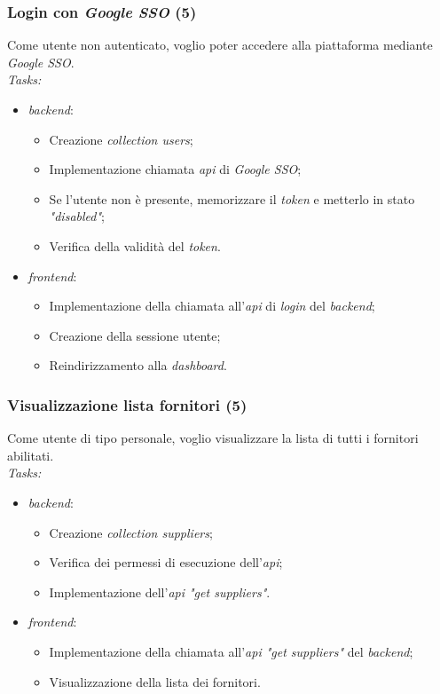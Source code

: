 \subsubsection{Login con \emph{Google SSO} (5)}
Come utente non autenticato, voglio poter accedere alla piattaforma mediante \emph{Google SSO}. \\
\emph{Tasks:}
\begin{itemize}
  \item \emph{\Gls{backend}}:
    \begin{itemize}
      \item Creazione \emph{collection users};
      \item Implementazione chiamata \emph{\acrshort{api}} di \emph{Google SSO};
      \item Se l'utente non è presente, memorizzare il \emph{token} e metterlo in stato \emph{"disabled"};
      \item Verifica della validità del \emph{token}.
    \end{itemize}
  \item \emph{\Gls{frontend}}:
    \begin{itemize}
      \item Implementazione della chiamata all'\emph{\acrshort{api}} di \emph{login} del \emph{\gls{backend}};
      \item Creazione della sessione utente;
      \item Reindirizzamento alla \emph{dashboard}.
    \end{itemize}
\end{itemize}

\subsubsection{Visualizzazione lista fornitori (5)}
Come utente di tipo personale, voglio visualizzare la lista di tutti i fornitori abilitati. \\
\emph{Tasks:}
\begin{itemize}
  \item \emph{\Gls{backend}}:
    \begin{itemize}
      \item Creazione \emph{collection suppliers};
      \item Verifica dei permessi di esecuzione dell'\emph{\acrshort{api}};
      \item Implementazione dell'\emph{\acrshort{api} "get suppliers"}.
    \end{itemize}
  \item \emph{\Gls{frontend}}:
    \begin{itemize}
      \item Implementazione della chiamata all'\emph{\acrshort{api} "get suppliers"} del \emph{\gls{backend}};
      \item Visualizzazione della lista dei fornitori.
    \end{itemize}
\end{itemize}

